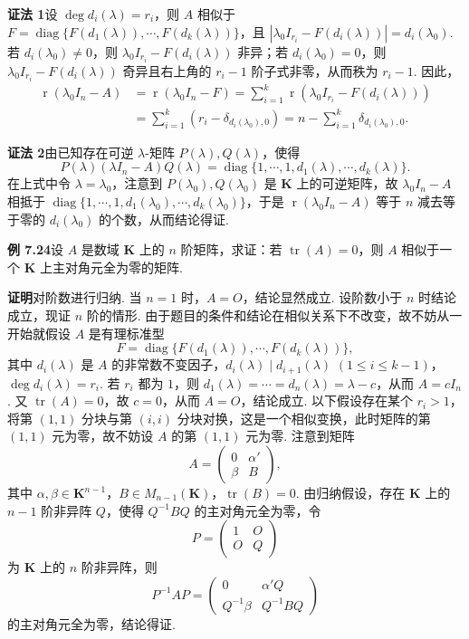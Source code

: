 \documentclass[UTF8, 12pt, fontset=fandol, oneside]{ctexart}
\begin{document}
\noindent\textbf{证法 1}\quad 设 $\deg d_i(\lambda)=r_i$，则 $A$ 相似于 $F=\operatorname{diag}\{F(d_1(\lambda)),\cdots,F(d_k(\lambda))\}$，且 $|\lambda_0I_{r_i}-F(d_i(\lambda))|=d_i(\lambda_0)$. 若 $d_i(\lambda_0)\ne 0$，则 $\lambda_0I_{r_i}-F(d_i(\lambda))$ 非异；若 $d_i(\lambda_0)=0$，则 $\lambda_0I_{r_i}-F(d_i(\lambda))$ 奇异且右上角的 $r_i-1$ 阶子式非零，从而秩为 $r_i-1$. 因此，
\[
\begin{aligned}
\operatorname{r}(\lambda_0I_n-A)
&=\operatorname{r}(\lambda_0I_n-F)
=\sum_{i=1}^k\operatorname{r}(\lambda_0I_{r_i}-F(d_i(\lambda)))\\
&=\sum_{i=1}^k(r_i-\delta_{d_i(\lambda_0),0})
=n-\sum_{i=1}^k\delta_{d_i(\lambda_0),0}.
\end{aligned}
\]

\noindent\textbf{证法 2}\quad 由已知存在可逆 $\lambda$-矩阵 $P(\lambda),Q(\lambda)$，使得
\[
P(\lambda)(\lambda I_n-A)Q(\lambda)=\operatorname{diag}\{1,\cdots,1,d_1(\lambda),\cdots,d_k(\lambda)\}.
\]
在上式中令 $\lambda=\lambda_0$，注意到 $P(\lambda_0),Q(\lambda_0)$ 是 $\mathbf{K}$ 上的可逆矩阵，故 $\lambda_0I_n-A$ 相抵于 $\operatorname{diag}\{1,\cdots,1,d_1(\lambda_0),\cdots,d_k(\lambda_0)\}$，于是 $\operatorname{r}(\lambda_0I_n-A)$ 等于 $n$ 减去等于零的 $d_i(\lambda_0)$ 的个数，从而结论得证.

\noindent\textbf{例 7.24}\quad 设 $A$ 是数域 $\mathbf{K}$ 上的 $n$ 阶矩阵，求证：若 $\operatorname{tr}(A)=0$，则 $A$ 相似于一个 $\mathbf{K}$ 上主对角元全为零的矩阵.

\noindent\textbf{证明}\quad 对阶数进行归纳. 当 $n=1$ 时，$A=O$，结论显然成立. 设阶数小于 $n$ 时结论成立，现证 $n$ 阶的情形. 由于题目的条件和结论在相似关系下不改变，故不妨从一开始就假设 $A$ 是有理标准型
\[
F=\operatorname{diag}\{F(d_1(\lambda)),\cdots,F(d_k(\lambda))\},
\]
其中 $d_i(\lambda)$ 是 $A$ 的非常数不变因子，$d_i(\lambda)\mid d_{i+1}(\lambda)$ $(1\le i\le k-1)$，$\deg d_i(\lambda)=r_i$. 若 $r_i$ 都为 $1$，则 $d_1(\lambda)=\cdots=d_n(\lambda)=\lambda-c$，从而 $A=cI_n$. 又 $\operatorname{tr}(A)=0$，故 $c=0$，从而 $A=O$，结论成立. 以下假设存在某个 $r_i>1$，将第 $(1,1)$ 分块与第 $(i,i)$ 分块对换，这是一个相似变换，此时矩阵的第 $(1,1)$ 元为零，故不妨设 $A$ 的第 $(1,1)$ 元为零. 注意到矩阵
\[
A=\left(\begin{array}{cc}
0 & \alpha'\\
\beta & B
\end{array}\right),
\]
其中 $\alpha,\beta\in\mathbf{K}^{n-1}$，$B\in M_{n-1}(\mathbf{K})$，$\operatorname{tr}(B)=0$. 由归纳假设，存在 $\mathbf{K}$ 上的 $n-1$ 阶非异阵 $Q$，使得 $Q^{-1}BQ$ 的主对角元全为零，令
\[
P=\left(\begin{array}{cc}
1 & O\\
O & Q
\end{array}\right)
\]
为 $\mathbf{K}$ 上的 $n$ 阶非异阵，则
\[
P^{-1}AP=
\left(\begin{array}{cc}
0 & \alpha'Q\\
Q^{-1}\beta & Q^{-1}BQ
\end{array}\right)
\]
的主对角元全为零，结论得证.
\end{document}
